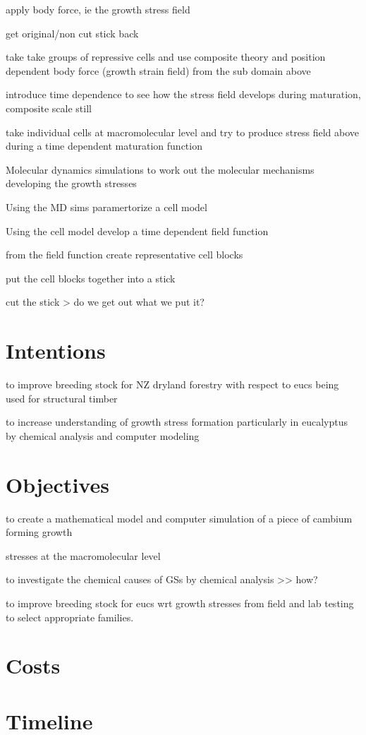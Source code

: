 \documentclass{article}
\begin{document}
apply body force, ie the growth stress field

get original/non cut stick back

take take groups of repressive cells and use composite theory and position dependent body force
(growth strain field) from the sub domain above

introduce time dependence to see how the stress field develops during
maturation, composite scale still

take individual cells at macromolecular level and try to produce stress field
above during a time dependent maturation function

Molecular dynamics simulations to work out the molecular mechanisms developing the growth stresses

Using the MD sims paramertorize a cell model

Using the cell model develop a time dependent field function

from the field function create representative cell blocks

put the cell blocks together into a stick

cut the stick > do we get out what we put it?

\section{Intentions}
to improve breeding stock for NZ dryland forestry with respect to eucs being used for structural timber

to increase understanding of growth stress formation particularly in eucalyptus
by chemical analysis and computer modeling

\section{Objectives}

to create a mathematical model and computer simulation of a piece of cambium forming growth

stresses at the macromolecular level

to investigate the chemical causes of GSs by chemical analysis >> how?

to improve breeding stock for eucs wrt growth stresses from field and lab testing to select appropriate families.

\section{Costs}

\section{Timeline}
\end{document}
